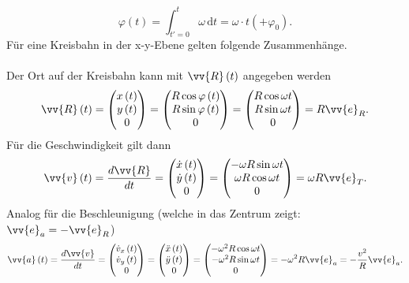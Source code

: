 \documentclass[a4paper,12pt]{article}
\newcommand{\td}{\,\text{d}}
\numberwithin{equation}{section}
\begin{document}
\[ 
        \varphi \left(t\right)=\int_{t'=0}^{t}\omega \td t=\omega \cdot t\left(+\varphi _0\right)
.\] 
Für eine Kreisbahn in der x-y-Ebene gelten folgende Zusammenhänge.\\\\
Der Ort auf der Kreisbahn kann mit $\vv{R}\left(t\right)$ angegeben werden
\[ 
        \vv{R}\left(t\right)=\left(\begin{matrix}
                x\left(t\right)\\y\left(t\right)\\0
        \end{matrix}\right)=\left(\begin{matrix}
                R\cos \varphi \left(t\right)\\R\sin \varphi \left(t\right)\\0
        \end{matrix}\right)=\left(\begin{matrix}
                R\cos \omega t\\R\sin \omega t\\0
        \end{matrix}\right)=R\vv{e}_R
.\] 
Für die Geschwindigkeit gilt dann
\[ 
        \vv{v}\left(t\right)=\dfrac{d\vv{R}}{dt}=\left(\begin{matrix}
                \dot{x}\left(t\right)\\\dot{y}\left(t\right)\\0
        \end{matrix}\right)=\left(\begin{matrix}
                -\omega R\sin \omega t\\\omega R\cos \omega t\\0
        \end{matrix}\right)=\omega R\vv{e}_T
.\] 
Analog für die Beschleunigung (welche in das Zentrum zeigt: $\vv{e}_a=-\vv{e}_R$)
\[ 
        \vv{a}\left(t\right)=\dfrac{d\vv{v}}{dt}=\left(\begin{matrix}
                \dot{v}_x\left(t\right)\\\dot{v}_y\left(t\right)\\0
        \end{matrix}\right)=\left(\begin{matrix}
                \ddot{x}\left(t\right)\\\ddot{y}\left(t\right)\\0
        \end{matrix}\right)=\left(\begin{matrix}
                -\omega ^2R\cos \omega t\\-\omega ^2R\sin \omega t\\0
        \end{matrix}\right)=-\omega ^2R\vv{e}_a=-\dfrac{v^2}{R}\vv{e}_a
.\] 
\end{document}
